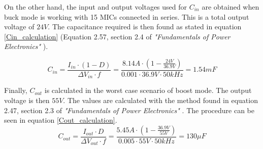 On the other hand, the input and output voltages used for $C_{in}$ are obtained when buck mode is working with 15 MICs connected in series. This is a total output voltage of $24 V$.
The capacitance required is then found as stated in equation \ref{Cin_calculation} (Equation 2.57, section 2.4 of \textit{"Fundamentals of Power Electronics"} \cite{Erickson}).

\begin{equation} \label{Cin_calculation}
C_{in} = \frac{I_{in} \cdot (1 - D)}{\Delta V_{in} \cdot f} = \frac{8.14 A \cdot ( 1 - \frac{24 V}{36.9 V})}{0.001 \cdot 36.9 V \cdot 50 kHz} = 1.54 mF
\end{equation}

Finally, $C_{out}$ is calculated in the worst case scenario of boost mode. The output voltage is then $55V$. The values are calculated with the method found in equation 2.47, section 2.3 of \textit{"Fundamentals of Power Electronics"} \cite{Erickson}. The procedure can be seen in equation \ref{Cout_calculation}.
\begin{equation} \label{Cout_calculation}
C_{out} = \frac{I_{out} \cdot D}{\Delta V_{out} \cdot f} = \frac{5.45 A \cdot ( 1 - \frac{36.9 V}{55 V})}{0.005 \cdot 55 V \cdot 50 kHz} = 130 \mu F
\end{equation}  
